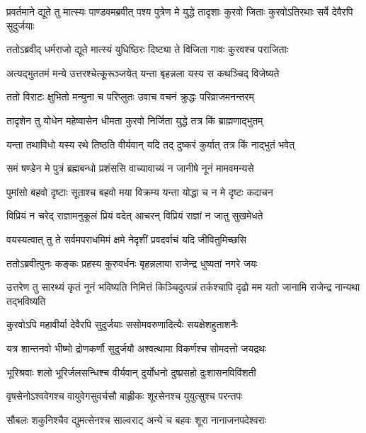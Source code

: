 \onelineshloka
{प्रवर्तमाने द्यूते तु मात्स्यः पाण्डवमब्रवीत्}
\twolineshloka
{पश्य पुत्रेण मे युद्धे तादृशाः कुरवो जिताः}
{कुरवोऽतिरथाः सर्वे देवैरपि सुदुर्जयाः}


\twolineshloka
{ततोऽब्रवीद् धर्मराजो द्यूते मात्स्यं युधिष्ठिरः}
{दिष्ट्या ते विजिता गावः कुरवश्च पराजिताः}


\twolineshloka
{अत्यद्भुततमं मन्ये उत्तरश्चेत्कूरूञ्जयेत्}
{यन्ता बृहन्नला यस्य स कथञ्चिद् विजेष्यते}


\twolineshloka
{ततो विराटः क्षुभितो मन्युना च परिप्लुतः}
{उवाच वचनं क्रुद्धः परिव्राजमनन्तरम्}


\twolineshloka
{तादृशेन तु योधेन महेष्वासेन धीमता}
{कुरवो निर्जिता युद्धे तत्र किं ब्राह्मणाद्भुतम्}



\twolineshloka
{यन्ता तथाविधो यस्य रथे तिष्ठति वीर्यवान्}
{यदि तद् दुष्करं कुर्यात् तत्र किं नाद्भुतं भवेत्}



\twolineshloka
{समं षण्डेन मे पुत्रं ब्रह्मबन्धो प्रशंससि}
{वाच्यावाच्यं न जानीषे नूनं मामवमन्यसे}


\twolineshloka
{पुमांसो बहवो दृष्टाः सूताश्च बहवो मया}
{विक्रम्य यन्ता योद्धा च न मे दृष्टः कदाचन}


\twolineshloka
{विप्रियं न चरेद् राज्ञामनुकूलं प्रियं वदेत्}
{आचरन् विप्रियं राज्ञां न जातु सुखमेधते}


\twolineshloka
{वयस्यत्वात् तु ते सर्वमपराधमिमं क्षमे}
{नेदृशीं प्रवदर्वाचं यदि जीवितुमिच्छसि}



\twolineshloka
{ततोऽब्रवीत्पुनः कङ्कः प्रहस्य कुरुवर्धनः}
{बृहन्नलाया राजेन्द्र धुष्यतां नगरे जयः}


\threelineshloka
{उत्तरेण तु सारथ्यं कृतं नूनं भविष्यति}
{निमित्तं किञ्चिदुत्पन्नं तर्कश्चापि दृढो मम}
{यतो जानामि राजेन्द्र नान्यथा तद्भविष्यति}


\twolineshloka
{कुरवोऽपि महावीर्या देवैरपि सुदुर्जयाः}
{ससोमवरुणादित्यैः सयक्षेशहुताशनैः}


\twolineshloka
{यत्र शान्तनवो भीष्मो द्रोणकर्णौ सुदुर्जयौ}
{अश्वत्थामा विकर्णश्च सोमदत्तो जयद्रथः}


\twolineshloka
{भूरिश्रवाः शलो भूरिर्जलसन्धिश्च वीर्यवान्}
{दुर्योधनो दुष्प्रसहो दुःशासनविविंशती}


\twolineshloka
{वृषसेनोऽश्ववेगश्च वायुवेगसुवर्चसौ}
{बाह्लीकः शूरसेनश्च युयुत्सुश्च परन्तपः}


\twolineshloka
{सौबलः शकुनिश्चैव द्युमत्सेनश्च साल्वराट्}
{अन्ये च बहवः शूरा नानाजनपदेश्वराः}


